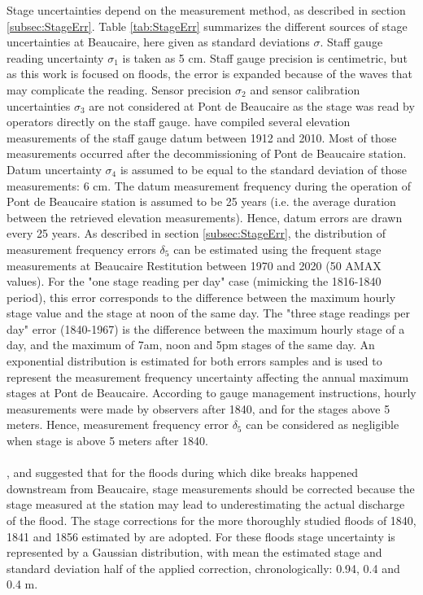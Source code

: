 \documentclass[11pt]{article}
\begin{document}
    Stage uncertainties depend on the measurement method, as described in section \ref{subsec:StageErr}. Table \ref{tab:StageErr} summarizes the different sources of stage uncertainties at Beaucaire, here given as standard deviations $\sigma$. Staff gauge reading uncertainty $\sigma_1$ is taken as 5 cm. Staff gauge precision is centimetric, but as this work is focused on floods, the error is expanded because of the waves that may complicate the reading. 
    Sensor precision $\sigma_2$ and sensor calibration uncertainties $\sigma_3$ are not considered at Pont de Beaucaire as the stage was read by operators directly on the staff gauge. 
    \citet{bard_actualisation_2018} have compiled several elevation measurements of the staff gauge datum between 1912 and 2010. Most of those measurements occurred after the decommissioning of Pont de Beaucaire station. Datum uncertainty $\sigma_4$ is assumed to be equal to the standard deviation of those measurements: 6 cm. The datum measurement frequency during the operation of Pont de Beaucaire station is assumed to be 25 years (i.e. the average duration between the retrieved elevation measurements). Hence, datum errors are drawn every 25 years. 
    As described in section \ref{subsec:StageErr}, the distribution of measurement frequency errors $\delta_5$ can be estimated using the frequent stage measurements at Beaucaire Restitution between 1970 and 2020 (50 AMAX values). For the "one stage reading per day" case (mimicking the 1816-1840 period), this error corresponds to the difference between the maximum hourly stage value and the stage at noon of the same day. The "three stage readings per day" error (1840-1967) is the difference between the maximum hourly stage of a day, and the maximum of 7am, noon and 5pm stages of the same day. An exponential distribution is estimated for both errors samples and is used to represent the measurement frequency uncertainty affecting the annual maximum stages at Pont de Beaucaire. According to gauge management instructions, hourly measurements were made by observers after 1840, and for the stages above 5 meters. Hence, measurement frequency error $\delta_5$ can be considered as negligible when stage is above 5 meters after 1840.
    \paragraph{}
    \citet{symadrem_programme_2012}, \citet{pichard_hauteurs_2013} and \citet{bard_actualisation_2018} suggested that for the floods during which dike breaks happened downstream from Beaucaire, stage measurements should be corrected because the stage measured at the station may lead to underestimating the actual discharge of the flood. The stage corrections for the more thoroughly studied floods of 1840, 1841 and 1856 estimated by \citet{symadrem_programme_2012} are adopted. For these floods stage uncertainty is represented by a Gaussian distribution, with mean the estimated stage and standard deviation half of the applied correction, chronologically: 0.94, 0.4 and 0.4 m. 
    \FloatBarrier
 
\end{document}
